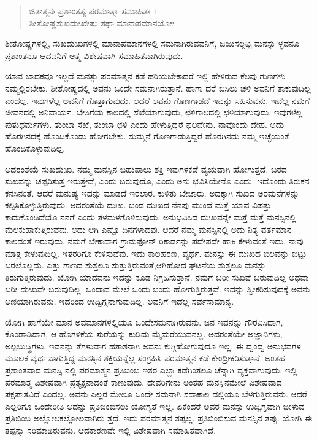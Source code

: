 \begin{verse}
ಜಿತಾತ್ಮನಃ ಪ್ರಶಾಂತಸ್ಯ ಪರಮಾತ್ಮಾ ಸಮಾಹಿತಃ~।\\ಶೀತೋಷ್ಣಸುಖದುಃಖೇಷು ತಥಾ ಮಾನಾಪಮಾನಯೋಃ 
\end{verse}

{\small ಶೀತೋಷ್ಣಗಳಲ್ಲಿ, ಸುಖದುಃಖಗಳಲ್ಲಿ ಮಾನಾಪಮಾನಗಳಲ್ಲಿ ಸಮನಾಗಿರುವವನಿಗೆ, ಜಯಿಸಲ್ಪಟ್ಟ ಮನಸ್ಸು ಳ್ಳವನೂ ಪ್ರಶಾಂತನೂ ಆದವನಿಗೆ ಆತ್ಮ ವಿಶೇಷವಾಗಿ ಸಮಾಹಿತವಾಗಿರುವುದು.}

ಯಾವ ಬಾಧಕವೂ ಇಲ್ಲದೆ ಮನಸ್ಸು ಪರಮಾತ್ಮನ ಕಡೆ ಹರಿಯಬೇಕಾದರೆ ಇಲ್ಲಿ ಹೇಳಿರುವ ಕೆಲವು ಗುಣಗಳು ನಮ್ಮಲ್ಲಿರಬೇಕು. ಶೀತೋಷ್ಣದಲ್ಲಿ ಅವನು ಒಂದೇ ಸಮನಾಗಿರುತ್ತಾನೆ. ಹಾಗಾ ದರೆ ಬಿಸಿಲು ಚಳಿ ಅವನಿಗೆ ತಾಕುವುದಿಲ್ಲ ಎಂದಲ್ಲ. ಇವುಗಳೆಲ್ಲ ಅವನಿಗೆ ಗೊತ್ತಾಗುವುದು. ಆದರೆ ಅವನು ಗೊಣಗಾಡದೆ ಇವನ್ನು ಸಹಿಸುವನು. ಇವೆಲ್ಲ ನಮಗೆ ಜೀವನದಲ್ಲಿ ಅನಿವಾರ್ಯ. ಬೇಸಿಗೆಯ ಕಾಲದಲ್ಲಿ ಸೆಖೆಯಾಗುವುದು, ಛಳಿಗಾಲದಲ್ಲಿ ಛಳಿಯಾಗುವುದು, ಇವುಗಳೆಲ್ಲ ಪುತುಧರ್ಮಗಳು. ತುಂಬಾ ಸೆಖೆ, ತುಂಬಾ ಛಳಿ ಎಂದು ಹೇಳುತ್ತಿದ್ದರೆ ಫಲವೇನು. ನಾವೊಂದು ದೇಹ. ಅದು ಹೊರಗಿನದಕ್ಕೆ ಹೊಂದಿಕೊಂಡು ಹೋಗಬೇಕು. ಸುಮ್ಮನೆ ಗೊಣಗಾಡುತ್ತಿದ್ದರೆ ಹೊರಗಿನದು ನಮ್ಮ ಇಚ್ಛೆಯಂತೆ ಹೊಂದಿಕೊಳ್ಳುವುದಿಲ್ಲ.

ಅದರಂತೆಯೆ ಸುಖದುಃಖ. ನಮ್ಮ ಮನಸ್ಸಿನ ಬಹುಪಾಲು ಶಕ್ತಿ ಇವುಗಳಕಡೆ ವ್ಯಯವಾಗಿ ಹೋಗುತ್ತದೆ. ಬರದ ಸುಖವನ್ನು ಚಪ್ಪರಿಸುತ್ತ ಇರುತ್ತೇವೆ, ಎಂದು ಬರುವುದೊ, ಎಂದು ಅನು ಭವಿಸಿಯೇನೊ ಎಂದು. ಇದೊಂದು ತಿರುಕನ ಕನಸಿನಂತೆ. ಆದರೆ ಮನುಷ್ಯ ಇದನ್ನು ಮಾಡದೆ ಇರಲಾರ. ಕುಳಿತು ಬೇಜಾರು. ಅದಕ್ಕಾಗಿ ಸುಖದ ಅರಮನೆಗಳನ್ನು ಕಲ್ಪಿಸಿಕೊಳ್ಳುತ್ತಿರುವುದು. ಅದರಂತೆಯೆ ದುಃಖ. ಬಂದ ದುಃಖದ ನೆನಪು ಮುಂದೆ ಮತ್ತೆ ಯಾವ ವಿಪತ್ತು ಕಾದುಕೊಂಡಿದೆಯೊ ನನಗೆ ಎಂದು ತಳಮಳಗೊಳಿಸುವುದು. ಅನುಭವಿಸಿದ ದುಃಖವನ್ನೇ ಮತ್ತೆ ಮತ್ತೆ ಮನಸ್ಸಿನಲ್ಲಿ ಮೆಲಕುಹಾಕುತ್ತಿರುವೆವು. ಅದು ಆಗಿ ಎಷ್ಟೊ ದಿನಗಳಾದವು. ಆದರೆ ನಮ್ಮ ಮನಸ್ಸಿನಲ್ಲಿ ಅದು ನಿತ್ಯ ವರ್ತಮಾನ ಕಾಲದಂತೆ ಇರುವುದು. ನಮಗೆ ಬೇಕಾದಾಗ ಗ್ರಾಮಫೋನ್ ರಿಕಾರ್ಡನ್ನು ಪದೇಪದೇ ಹಾಕಿ ಕೇಳುವಂತೆ ಇದು. ನಾವು ಮಾತ್ರ ಕೇಳುವುದಿಲ್ಲ. ಇತರರಿಗೂ ಕೇಳಿಸುವೆವು. ಇದು ಕಾಲಹರಣ, ವ್ಯರ್ಥ. ಮನಸ್ಸು ಈ ದುಃಖದ ಬಿಲವನ್ನು ಬಿಟ್ಟು ಬರಲೊಲ್ಲದು. ಎತ್ತು ಗಾಣದ ಸುತ್ತಲೂ ಸುತ್ತುತ್ತಿರುವಂತೆ,ಆಗಿಹೋದ ಘಟನೆಯ ಸುತ್ತಲೂ ಮನಸ್ಸು ತಿರುಗುತ್ತಿರುವುದು. ಯೋಗಿ ಯಾದವನು ಇದನ್ನು ಕೂಡ ನಿಗ್ರಹಿಸುತ್ತಾನೆ. ನಮಗೆ ಬರೀ ಸುಖವೆ ಬರುವುದಿಲ್ಲ ಅಥವಾ ಬರೀ ದುಃಖವೇ ಬರುವುದಿಲ್ಲ. ಒಂದಾದ ಮೇಲೆ ಒಂದು ಬಂದು ಹೋಗುತ್ತಿರುತ್ತವೆ. ಇದನ್ನು ಸ್ವೀಕರಿಸುವುದಕ್ಕೆ ಅವನು ಅಣಿಯಾಗಿರುವನು. ಇದರಿಂದ ಉದ್ವಿಗ್ನನಾಗುವುದಿಲ್ಲ. ಅವನಿಗೆ ಇದೆಲ್ಲ ಸರ್ವೆಸಾಮಾನ್ಯ.

ಯೋಗಿ ಹಾಗೆಯೇ ಮಾನ ಅವಮಾನಗಳಲ್ಲಿಯೂ ಒಂದೇಸಮನಾಗಿರುವನು. ಜನ ಇವನನ್ನು ಗೌರವಿಸಿದಾಗ, ಕೊಂಡಾಡಿದಾಗ, ಆ ಹೊಗಳಿಕೆಯ ಸುರೆಯನ್ನು ಕುಡಿದು ಮೈಮರೆಯುವನಲ್ಲ. ಅದರಂತೆಯೇ ಅಜ್ಞಾನಿಗಳು, ಅಲ್ಪಬುದ್ಧಿಗಳು, ಇವನನ್ನು ತೆಗಳುವಾಗ ಹತಾಶನಾಗಿ ಅವನು ಕುಗ್ಗಿಹೋಗುವುದೂ ಇಲ್ಲ. ಈ ದ್ವಂದ್ವ ಅನುಭವಗಳ ಮೂಲಕ ವ್ಯರ್ಥವಾಗುತ್ತಿದ್ದ ಮನಸ್ಸಿನ ಶಕ್ತಿಯನ್ನೆಲ್ಲ ಸಂಗ್ರಹಿಸಿ ಪರಮಾತ್ಮನ ಕಡೆ ಕೇಂದ್ರೀಕರಿಸುತ್ತಾನೆ. ಅಂತಹ ಪ್ರಶಾಂತವಾದ ಮನಸ್ಸಿ ನಲ್ಲಿ ಪರಮಾತ್ಮನ ಪ್ರತಿಬಿಂಬ ಇತರ ಎಲ್ಲಾ ಕಡೆಗಿಂತಲೂ ಚೆನ್ನಾಗಿ ವ್ಯಕ್ತವಾಗುವುದು. ಇಲ್ಲಿ ಪರಮಾತ್ಮ ವಿಶೇಷವಾಗಿ ಪ್ರತ್ಯಕ್ಷನಾದಂತೆ ಕಾಣುವುದು. ದೇವರಿಗೇನು ಅಂತಹ ಮನಸ್ಸಿನಮೇಲೆ ವಿಶೇಷವಾದ ಪಕ್ಷಪಾತವಿದೆ ಎಂದಲ್ಲ. ಅವನು ಎಲ್ಲರ ಮೇಲೂ ಒಂದೇ ಸಮನಾಗಿ ಸದಾಕಾಲ ದಲ್ಲಿಯೂ ಬೆಳಗುತ್ತಿರುವನು. ಆದರೆ ಎಲ್ಲರಿಗೂ ಒಂದೇರೀತಿ ಅದನ್ನು ಪ್ರತಿಬಿಂಬಿಸಲು ಯೋಗ್ಯತೆ ಇಲ್ಲ. ಏಕೆಂದರೆ ಅವರ ಮನಸ್ಸು ಉದ್ವಿಗ್ನವಾಗಿ ಬೀಳುವ ಪ್ರತಿಬಿಂಬ ಅಲ್ಲೋಲಕಲ್ಲೋಲವಾಗಿರು ತ್ತದೆ. ಇದು ಪರಮಾತ್ಮನ ತಪ್ಪಲ್ಲ. ಪ್ರತಿಬಿಂಬಿಸುವ ಮನಸ್ಸಿನ ತಪ್ಪು. ಯೋಗಿ ಈ ತಪ್ಪನ್ನು ಸರಿಮಾಡಿರುವನು. ಆದಕಾರಣವೇ ಇಲ್ಲಿ ವಿಶೇಷವಾಗಿ ಸಮಾಹಿತವಾಗಿದೆ.

